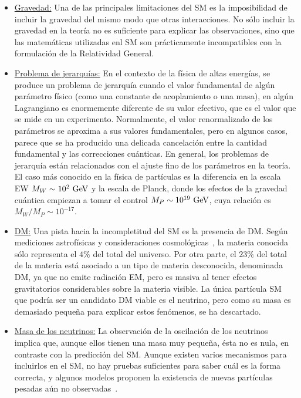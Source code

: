 \begin{itemize}
    \item \underline{Gravedad:} Una de las principales limitaciones del \ac{SM} es la imposibilidad de incluir la gravedad del mismo modo que otras interacciones. No sólo incluir la gravedad en la teoría no es suficiente para explicar las observaciones, sino que las matemáticas utilizadas enl \ac{SM} son prácticamente incompatibles con la formulación de la Relatividad General.
    \item \underline{Problema de jerarqu\'ias:} En el contexto de la física de altas energías, se produce un problema de jerarquía cuando el valor fundamental de algún parámetro físico (como una constante de acoplamiento o una masa), en algún Lagrangiano es enormemente diferente de su valor efectivo, que es el valor que se mide en un experimento. Normalmente, el valor renormalizado de los parámetros se aproxima a sus valores fundamentales, pero en algunos casos, parece que se ha producido una delicada cancelación entre la cantidad fundamental y las correcciones cuánticas. En general, los problemas de jerarquía están relacionados con el ajuste fino de los parámetros en la teoría. El caso más conocido en la física de partículas es la diferencia en la escala \ac{EW} \(M_W \sim 10^2~\text{GeV}\) y la escala de Planck, donde los efectos de la gravedad cuántica empiezan a tomar el control \(M_P\sim10^{19}~\text{GeV}\), cuya relación es \(M_W / M_P \sim 10^{-17}\).
    \item \underline{\acf{DM}:} Una pista hacia la incompletitud del \ac{SM} es la presencia de \ac{DM}. Según mediciones astrofísicas y consideraciones cosmológicas~\cite{Zwicky-1937,Rubin_Kent-1970,Planck-2014,Clowe-2006,Brada-2008}, la materia conocida sólo representa el \(4\%\) del total del universo. Por otra parte, el \(23\%\) del total de la materia está asociado a un tipo de materia desconocida, denominada \ac{DM}, ya que no emite radiación \ac{EM}, pero es masiva al tener efectos gravitatorios considerables sobre la materia visible. La única partícula \ac{SM} que podría ser un candidato \ac{DM} viable es el neutrino, pero como su masa es demasiado pequeña para explicar estos fenómenos, se ha descartado.
    \item \underline{Masa de los neutrinos:} La observación de la oscilación de los neutrinos implica que, aunque ellos tienen una masa muy pequeña, ésta no es nula, en contraste con la predicción del \ac{SM}. Aunque existen varios mecanismos para incluirlos en el \ac{SM}, no hay pruebas suficientes para saber cuál es la forma correcta, y algunos modelos proponen la existencia de nuevas partículas pesadas aún no observadas~\cite{GellMann_Ramond_Slansky-2010,Glashow-1980,Ramond-2005}.
\end{itemize}






